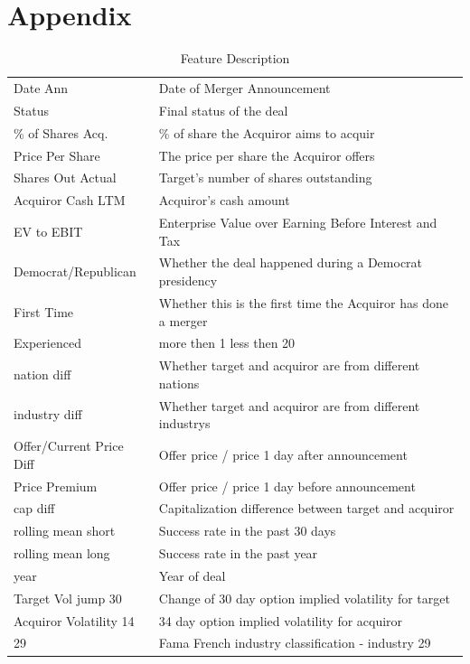 \documentclass[a4paper]{article}
\begin{document}
\newpage 
\section{Appendix }
\label{sec:tables}

\begin{table}[h]
\caption{Feature Description}
\begin{tabular}{ll}
Date Ann                 & Date of Merger Announcement                                  \\
Status                   & Final status of the deal                                     \\
\% of Shares Acq.        & \% of share the Acquiror aims to acquir                      \\
Price Per Share          & The price per share the Acquiror offers                      \\
Shares Out Actual        & Target's number of shares outstanding                        \\
Acquiror Cash LTM        & Acquiror's cash amount                                       \\
EV to EBIT               & Enterprise Value over Earning Before Interest and Tax        \\
Democrat/Republican      & Whether the deal happened during a Democrat presidency       \\
First Time               & Whether this is the first time the Acquiror has done a merger \\
Experienced              & more then 1 less then 20                            \\
nation diff              & Whether target and acquiror are from different nations       \\
industry diff            & Whether target and acquiror are from different industrys     \\
Offer/Current Price Diff & Offer price / price 1 day after announcement                 \\
Price Premium            & Offer price / price 1 day before announcement                \\
cap diff                & Capitalization difference between target and acquiror       \\
rolling mean short               & Success rate in the past 30 days  \\
rolling mean long              & Success rate in the past year                            \\
year              & Year of deal       \\
Target Vol jump 30         & Change of 30 day option implied volatility for target     \\
Acquiror Volatility 14 & 34 day option implied volatility for acquiror              \\
29          & Fama French industry classification - industry 29            
\end{tabular}
\end{table}
\end{document}
